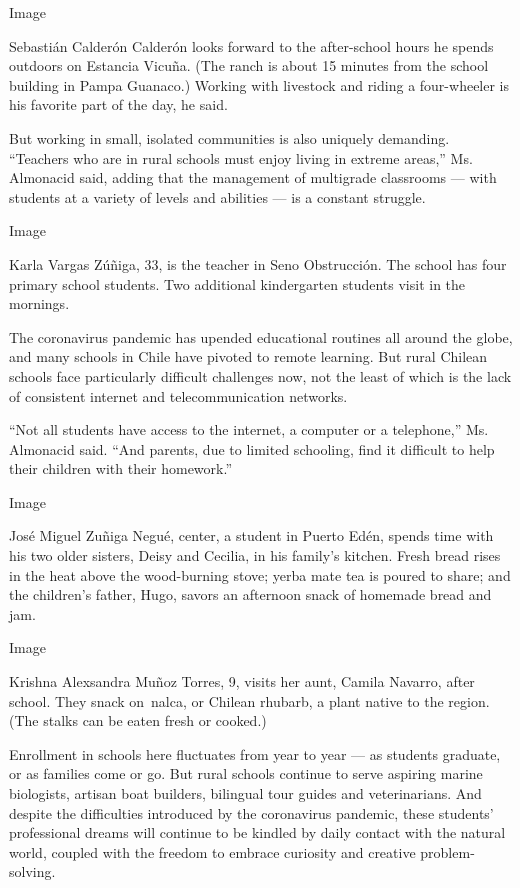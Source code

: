 Image

Sebastián Calderón Calderón looks forward to the after-school hours he
spends outdoors on Estancia Vicuña. (The ranch is about 15 minutes from
the school building in Pampa Guanaco.) Working with livestock and riding
a four-wheeler is his favorite part of the day, he said.

But working in small, isolated communities is also uniquely demanding.
``Teachers who are in rural schools must enjoy living in extreme
areas,'' Ms. Almonacid said, adding that the management of multigrade
classrooms --- with students at a variety of levels and abilities --- is
a constant struggle.

Image

Karla Vargas Zúñiga, 33, is the teacher in Seno Obstrucción. The school
has four primary school students. Two additional kindergarten students
visit in the mornings.

The coronavirus pandemic has upended educational routines all around the
globe, and many schools in Chile have pivoted to remote learning. But
rural Chilean schools face particularly difficult challenges now, not
the least of which is the lack of consistent internet and
telecommunication networks.

``Not all students have access to the internet, a computer or a
telephone,'' Ms. Almonacid said. ``And parents, due to limited
schooling, find it difficult to help their children with their
homework.''

Image

José Miguel Zuñiga Negué, center, a student in Puerto Edén, spends time
with his two older sisters, Deisy and Cecilia, in his family's kitchen.
Fresh bread rises in the heat above the wood-burning stove; yerba mate
tea is poured to share; and the children's father, Hugo, savors an
afternoon snack of homemade bread and jam.

Image

Krishna Alexsandra Muñoz Torres, 9, visits her aunt, Camila Navarro,
after school. They snack on~nalca, or Chilean rhubarb, a plant native to
the region. (The stalks can be eaten fresh or cooked.)

Enrollment in schools here fluctuates from year to year --- as students
graduate, or as families come or go. But rural schools continue to serve
aspiring marine biologists, artisan boat builders, bilingual tour guides
and veterinarians. And despite the difficulties introduced by the
coronavirus pandemic, these students' professional dreams will continue
to be kindled by daily contact with the natural world, coupled with the
freedom to embrace curiosity and creative problem-solving.

